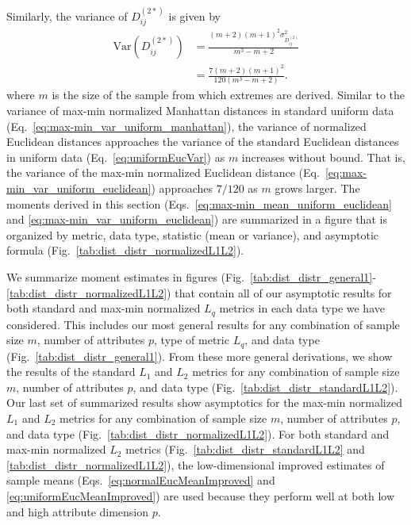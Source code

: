\documentclass[10pt,letterpaper]{article}
\begin{document}
Similarly, the variance of $D^{(2*)}_{ij}$ is given by
%
\begin{equation}\label{eq:max-min_var_uniform_euclidean}
\begin{aligned}
\text{Var}\left(D^{(2*)}_{ij}\right) &= \frac{(m+2)(m+1)^2\sigma^2_{D^{(2)}_{ij}}}{m^3 - m + 2} \\
&= \frac{7(m+2)(m+1)^2}{120(m^3 - m + 2)}.
\end{aligned}
\end{equation}
%
where $m$ is the size of the sample from which extremes are derived. Similar to the variance of max-min normalized Manhattan distances in standard uniform data (Eq.~\ref{eq:max-min_var_uniform_manhattan}), the variance of normalized Euclidean distances approaches the variance of the standard Euclidean distances in uniform data (Eq.~\ref{eq:uniformEucVar}) as $m$ increases without bound. That is, the variance of the max-min normalized Euclidean distance (Eq.~\ref{eq:max-min_var_uniform_euclidean}) approaches $7/120$ as $m$ grows larger. The moments derived in this section (Eqs.~\ref{eq:max-min_mean_uniform_euclidean} and \ref{eq:max-min_var_uniform_euclidean}) are summarized in a figure that is organized by metric, data type, statistic (mean or variance), and asymptotic formula (Fig.~\ref{tab:dist_distr_normalizedL1L2}).

We summarize moment estimates in figures (Fig.~\ref{tab:dist_distr_general1}-\ref{tab:dist_distr_normalizedL1L2}) that contain all of our asymptotic results for both standard and max-min normalized $L_q$ metrics in each data type we have considered. This includes our most general results for any combination of sample size $m$, number of attributes $p$, type of metric $L_q$, and data type (Fig.~\ref{tab:dist_distr_general1}). From these more general derivations, we show the results of the standard $L_1$ and $L_2$ metrics for any combination of sample size $m$, number of attributes $p$, and data type (Fig.~\ref{tab:dist_distr_standardL1L2}). Our last set of summarized results show asymptotics for the max-min normalized $L_1$ and $L_2$ metrics for any combination of sample size $m$, number of attributes $p$, and data type (Fig.~\ref{tab:dist_distr_normalizedL1L2}). For both standard and max-min normalized $L_2$ metrics (Fig.~\ref{tab:dist_distr_standardL1L2} and \ref{tab:dist_distr_normalizedL1L2}), the low-dimensional improved estimates of sample means (Eqs.~\ref{eq:normalEucMeanImproved} and \ref{eq:uniformEucMeanImproved}) are used because they perform well at both low and high attribute dimension $p$.
\end{document}
